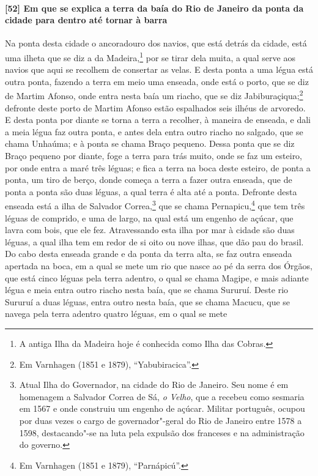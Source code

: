 \begin{linenumbers}
\paragraph{[52] Em que se explica a terra da baía do Rio de Janeiro da ponta da cidade para
dentro até tornar à barra} \quad
Na ponta desta cidade o ancoradouro dos navios, que está detrás da cidade, está uma ilheta
que se diz a da Madeira,\footnote{ A antiga Ilha da Madeira hoje é conhecida como Ilha das
Cobras.} por se tirar dela muita, a qual serve aos navios que aqui se recolhem de
consertar as velas. E desta ponta a uma légua está outra ponta, fazendo a terra em meio
uma enseada, onde está o porto, que se diz de Martim Afonso, onde entra nesta baía um
riacho, que se diz Jabiburaçiqua;\footnote{ Em Varnhagen (1851 e 1879), ``Yabubiracica''.}
defronte deste porto de Martim Afonso estão espalhados seis ilhéus de arvoredo. E desta
ponta por diante se torna a terra a recolher, à maneira de enseada, e dali a meia légua
faz outra ponta, e antes dela entra outro riacho no salgado, que se chama Unhaúma; e à
ponta se chama Braço pequeno. Dessa ponta que se diz Braço pequeno por diante, foge a
terra para trás muito, onde se faz um esteiro, por onde entra a maré três léguas; e fica a
terra na boca deste esteiro, de ponta a ponta, um tiro de berço, donde começa a terra a
fazer outra enseada, que de ponta a ponta são duas léguas, a qual terra é alta até a
ponta. Defronte desta enseada está a ilha de Salvador Correa,\footnote{ Atual Ilha do
Governador, na cidade do Rio de Janeiro. Seu nome é em homenagem a Salvador Correa de Sá,
\textit{o Velho}, que a recebeu como sesmaria em 1567 e onde construiu um engenho de
açúcar. Militar português, ocupou por duas vezes o cargo de governador"-geral do Rio de
Janeiro entre 1578 a 1598, destacando"-se na luta pela expulsão dos franceses e na
administração do governo.} que se chama Pernapicu,\footnote{ Em Varnhagen (1851 e 1879),
``Parnápicú''.} que tem três léguas de comprido, e uma de largo, na qual está um engenho
de açúcar, que lavra com bois, que ele fez. Atravessando esta ilha por mar à cidade são
duas léguas, a qual ilha tem em redor de si oito ou nove ilhas, que dão pau do brasil. Do
cabo desta enseada grande e da ponta da terra alta, se faz outra enseada apertada na boca,
em a qual se mete um rio que nasce ao pé da serra dos Órgãos, que está cinco léguas pela
terra adentro, o qual se chama Magipe, e mais adiante légua e meia entra outro riacho
nesta baía, que se chama Sururuí. Deste rio Sururuí a duas léguas, entra outro nesta baía,
que se chama Macucu, que se navega pela terra adentro quatro léguas, em o qual se mete

\end{linenumbers}
